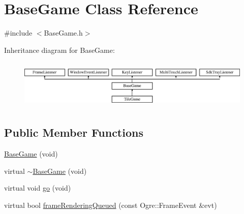 \hypertarget{classBaseGame}{\section{Base\-Game Class Reference}
\label{classBaseGame}
}


{\ttfamily \#include $<$Base\-Game.\-h$>$}

Inheritance diagram for Base\-Game\-:\begin{figure}[H]
\begin{center}
\leavevmode
\includegraphics[height=2.382979cm]{classBaseGame}
\end{center}
\end{figure}
\subsection*{Public Member Functions}
\begin{DoxyCompactItemize}
\item 
\hyperlink{classBaseGame_a8c345641d3157e25860e94d7ed4496eb}{Base\-Game} (void)
\item 
virtual \hyperlink{classBaseGame_a88961ab12f1bfeddc4c3a6349aab4b77}{$\sim$\-Base\-Game} (void)
\item 
virtual void \hyperlink{classBaseGame_ab272d0e4ad78bfe63d852c9689bfc8c0}{go} (void)
\item 
virtual bool \hyperlink{classBaseGame_a19f0d398dd44cde608944620e8e17e89}{frame\-Rendering\-Queued} (const Ogre\-::\-Frame\-Event \&evt)
\end{DoxyCompactItemize}
